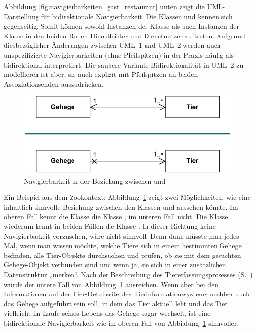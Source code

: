 Abbildung~\ref{fig:navigierbarkeiten_gast_restaurant} unten zeigt die UML-Darstellung für bidirektionale Navigierbarkeit. Die Klassen  und  kennen sich gegenseitig. Somit können sowohl Instanzen der Klasse  als auch Instanzen der Klasse  in den beiden Rollen Dienstleister und Dienstnutzer auftreten. Aufgrund diesbezüglicher Änderungen zwischen UML~1 und UML~2 werden auch unspezifizierte Navigierbarkeiten (ohne Pfeilspitzen) in der Praxis häufig als bidirektional interpretiert. Die saubere Variante Bidirektionalität in UML~2 zu modellieren ist aber, sie auch explizit mit Pfeilspitzen an beiden Assoziationsenden auszudrücken.

\begin{figure}[h!]
	\centering
	\includegraphics[scale=1.0]{Bilder/Kapitel-8/navigierbarkeit_tier.pdf}
	\caption{Navigierbarkeit in der Beziehung zwischen  und }
	\label{fig:navigierbarkeit_tier}
\end{figure}

Ein Beispiel aus dem Zookontext: Abbildung~\ref{fig:navigierbarkeit_tier} zeigt zwei Möglichkeiten, wie \mbox{eine} inhaltlich sinnvolle Beziehung zwischen den Klassen  und  aussehen könnte. Im oberen Fall kennt die Klasse  die Klasse , im unteren Fall nicht. Die Klasse  wiederum kennt in beiden Fällen die Klasse . In dieser Richtung keine Navigierbarkeit vorzusehen, wäre nicht sinnvoll. Denn dann müsste man jedes Mal, wenn man wissen möchte, welche Tiere sich in einem bestimmten \mbox{Gehege} befinden, alle Tier-Objekte durchsuchen und prüfen, ob sie mit dem gesuchten Gehege-Objekt verbunden sind und wenn ja, sie sich in einer zusätzlichen Datenstruktur „merken“. Nach der Beschreibung des Tiererfassungsprozesses (S.~\pageref{sec:Kap-8.2:Tiererfassung}) würde der untere Fall von Abbildung~\ref{fig:navigierbarkeit_tier} ausreichen. Wenn aber bei den Informa\-tionen auf der Tier-Detailseite des Tierinformationssystems nachher auch das \mbox{Gehege} aufgeführt sein soll, in dem das Tier aktuell lebt und das Tier vielleicht im Laufe seines Lebens das Gehege sogar wechselt, ist eine bidirektionale Navi\-gierbar\-keit wie im oberen Fall von Abbildung~\ref{fig:navigierbarkeit_tier} sinnvoller. 

